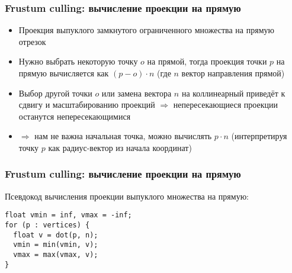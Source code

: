 \documentclass{beamer}
\begin{document}
\begin{frame}[fragile]
\frametitle{Frustum culling: вычисление проекции на прямую}
\begin{itemize}
\item Проекция выпуклого замкнутого ограниченного множества на прямую \textendash{} отрезок
\pause
\item Нужно выбрать некоторую точку \begin{math}o\end{math} на прямой, тогда проекция точки \begin{math}p\end{math} на прямую вычисляется как \begin{math}(p - o) \cdot n\end{math} (где \begin{math}n\end{math} \textendash{} вектор направления прямой)
\pause
\item Выбор другой точки \begin{math}o\end{math} или замена вектора \begin{math}n\end{math} на коллинеарный приведёт к сдвигу и масштабированию проекций \begin{math}\Rightarrow\end{math} непересекающиеся проекции останутся непересекающимися
\pause
\item \begin{math}\Rightarrow\end{math} нам не важна начальная точка, можно вычислять \begin{math}p \cdot n\end{math} (интерпретируя точку \begin{math}p\end{math} как радиус-вектор из начала координат)
\end{itemize}
\end{frame}

\begin{frame}[fragile]
\fontsize{10pt}{10pt}
\frametitle{Frustum culling: вычисление проекции на прямую}
Псевдокод вычисления проекции выпуклого множества на прямую:
\begin{verbatim}
float vmin = inf, vmax = -inf;
for (p : vertices) {
  float v = dot(p, n);
  vmin = min(vmin, v);
  vmax = max(vmax, v);
}
\end{verbatim}
\end{frame}
\end{document}
